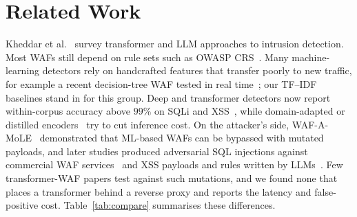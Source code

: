 \documentclass[conference]{IEEEtran}
\begin{document}
\section{Related Work}
Kheddar et al.~\cite{kheddar2025survey} survey transformer and LLM
approaches to intrusion detection. Most WAFs still depend on
rule sets such as OWASP CRS~\cite{owaspcrs}. Many machine-learning
detectors rely on handcrafted features that transfer poorly to new traffic,
for example a recent decision-tree WAF tested in real time~\cite{mlwaf2025peerj};
our TF--IDF baselines stand in for this group. Deep and transformer
detectors now report within-corpus accuracy above $99\%$ on SQLi and
XSS~\cite{scireports2024novelxsssqli,wadbert2026,zhou2025ewebguard}, while
domain-adapted or distilled
encoders~\cite{aghaei2022securebert,aghaei2025securebert2,sanh2019distilbert}
try to cut inference cost. On the attacker's side, WAF-A-MoLE~\cite{demetrio2020wafamole}
demonstrated that ML-based WAFs can be bypassed with mutated payloads,
and later studies produced adversarial SQL injections against commercial
WAF services~\cite{advsqli2024} and XSS payloads and rules written by
LLMs~\cite{genxss2025}. Few transformer-WAF papers test against such
mutations, and we found none that places a transformer behind a reverse
proxy and reports the latency and false-positive cost. Table~\ref{tab:compare}
summarises these differences.
\end{document}
